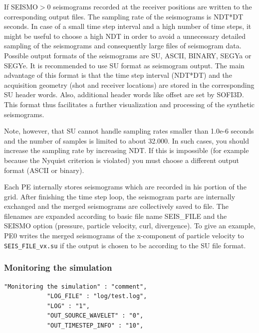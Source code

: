 \documentclass[11pt,onecolumn,oneside]{article}
\begin{document}
If SEISMO$>$0 seismograms recorded at the receiver positions are written to the corresponding output files. The sampling rate of the seismograms is NDT*DT seconds. In case of a small
time step interval and a high number of time steps, it might be useful to choose a high NDT in order to avoid a unnecessary detailed sampling of the seismograms and consequently large files of seismogram data. Possible output formats of the seismograms are SU, ASCII, BINARY, SEGYa or SEGYe. It is recommended to use SU format as seismogram output. The main advantage of this format is that the
time step interval (NDT*DT) and the acquisition geometry (shot and receiver locations) are stored in the corresponding SU header words. Also, additional header words like offset are set by SOFI3D. This format thus facilitates a further visualization and processing of the synthetic seismograms.

Note, however, that SU cannot handle sampling rates smaller than 1.0e-6 seconds and the number of samples is limited to about 32.000. In such cases, you should increase the sampling rate by increasing NDT. If this is impossible (for example because the Nyquist criterion is violated) you must choose a different output format (ASCII or binary).

Each PE internally stores seismograms which are recorded in his portion of the grid. After finishing the time step loop, the seismogram parts are internally exchanged and the merged seismograms are collectively saved to file. The filenames are expanded according to basic file name SEIS\_FILE and the SEISMO option (pressure, particle velocity, curl, divergence). To give an example, PE0 writes the merged seismograms of the x-component of particle velocity to  \lstinline{SEIS_FILE_vx.su} if the output is chosen to be according to the SU file format. 


\subsubsection{Monitoring the simulation}
\begin{verbatim}
"Monitoring the simulation" : "comment",
            "LOG_FILE" : "log/test.log",
            "LOG" : "1",
            "OUT_SOURCE_WAVELET" : "0",
            "OUT_TIMESTEP_INFO" : "10",

\end{verbatim}
\end{document}
